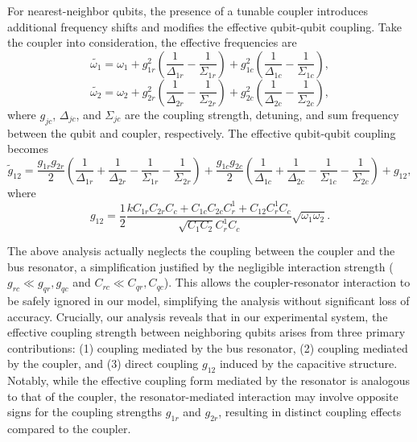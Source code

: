 \documentclass[reprint,superscriptaddress,preprintnumbers,longbibliography,
amsmath,amssymb,aps,floatfix,pra,twocolumn, tightenlines %
]{revtex4-2}
\begin{document}
For nearest-neighbor qubits, the presence of a tunable coupler introduces additional frequency shifts and modifies the effective qubit-qubit coupling. Take the coupler into consideration, the effective frequencies are
\begin{equation} \widetilde{\omega_1} = \omega_1 + g_{1r}^2 \left( \frac{1}{\Delta_{1r}} - \frac{1}{\Sigma_{1r}} \right) + g_{1c}^2 \left( \frac{1}{\Delta_{1c}} - \frac{1}{\Sigma_{1c}} \right), \end{equation}
\begin{equation} \widetilde{\omega_2} = \omega_2 + g_{2r}^2 \left( \frac{1}{\Delta_{2r}} - \frac{1}{\Sigma_{2r}} \right) + g_{2c}^2 \left( \frac{1}{\Delta_{2c}} - \frac{1}{\Sigma_{2c}} \right), \end{equation}
where \( g_{jc} \), \( \Delta_{jc} \), and \( \Sigma_{jc} \) are the coupling strength, detuning, and sum frequency between the qubit and coupler, respectively. The effective qubit-qubit coupling becomes
\begin{equation} 
\widetilde{g}_{12} = \frac{g_{1r} g_{2r}}{2} \left( \frac{1}{\Delta_{1r}} + \frac{1}{\Delta_{2r}} - \frac{1}{\Sigma_{1r}} - \frac{1}{\Sigma_{2r}} \right) + \frac{g_{1c} g_{2c}}{2} \left( \frac{1}{\Delta_{1c}} + \frac{1}{\Delta_{2c}} - \frac{1}{\Sigma_{1c}} - \frac{1}{\Sigma_{2c}} \right) + g_{12}, 
\end{equation}
where
\begin{equation} g_{12} = \frac{1}{2} \frac{k C_{1r} C_{2r} C_c + C_{1c} C_{2c} C_r^1 + C_{12} C_r^1 C_c}{\sqrt{C_1 C_2} C_r^1 C_c} \sqrt{\omega_1 \omega_2}. \end{equation}

The above analysis actually neglects the coupling between the coupler and the bus resonator, a simplification justified by the negligible interaction strength ($g_{rc} \ll g_{qr}, g_{qc}$ and \( C_{rc} \ll C_{qr}, C_{qc}\)). This allows the coupler-resonator interaction to be safely ignored in our model, simplifying the analysis without significant loss of accuracy. Crucially, our analysis reveals that in our experimental system, the effective coupling strength between neighboring qubits arises from three primary contributions: (1) coupling mediated by the bus resonator, (2) coupling mediated by the coupler, and (3) direct coupling $g_{12}$ induced by the capacitive structure. Notably, while the effective coupling form mediated by the resonator is analogous to that of the coupler, the resonator-mediated interaction may involve opposite signs for the coupling strengths \( g_{1r} \) and \( g_{2r} \), resulting in distinct coupling effects compared to the coupler.
\end{document}
